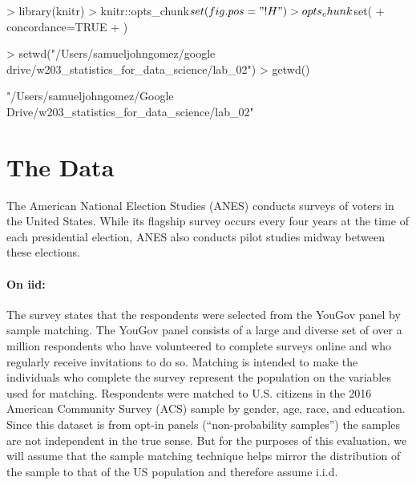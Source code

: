 \documentclass[12pt]{article}
\begin{document}


\begin{Schunk}
\begin{Sinput}
> library(knitr)
> knitr::opts_chunk$set(fig.pos = "!H")
> opts_chunk$set(
+ concordance=TRUE
+ )
\end{Sinput}
\end{Schunk}
\begin{Schunk}
\begin{Sinput}
> setwd("/Users/samueljohngomez/google drive/w203_statistics_for_data_science/lab_02")
> getwd()
\end{Sinput}
\begin{Soutput}
[1] "/Users/samueljohngomez/Google Drive/w203_statistics_for_data_science/lab_02"
\end{Soutput}
\end{Schunk}


\maketitle
\section{The Data}
The American National Election Studies (ANES) conducts surveys of voters in the United States. While its flagship survey occurs every four years at the time of each presidential election, ANES also conducts pilot studies midway between these elections. 

\paragraph{On iid:}
The survey states that the respondents were selected from the YouGov panel by sample matching. The YouGov panel consists of a large and diverse set of over a million respondents who have volunteered to complete surveys online and who regularly receive invitations to do so. Matching is intended to make the individuals who complete the survey represent the population on the variables used for matching. Respondents were matched to U.S. citizens in the 2016 American Community Survey (ACS) sample by gender, age, race, and education.  Since this dataset is from opt-in panels (“non-probability samples”) the samples are not independent in the true sense.   But for the purposes of this evaluation, we will assume that the sample matching technique helps mirror the distribution of the sample to that of the US population and therefore assume i.i.d.
\end{document}
